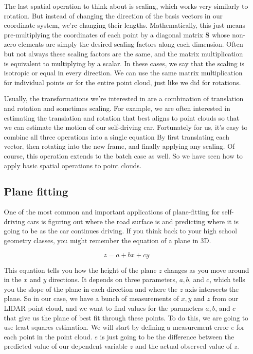 The last spatial operation
to think about is scaling, which works very similarly to rotation. But instead of changing the direction
of the basis vectors in our coordinate system,
we're changing their lengths. Mathematically, this just means
pre-multiplying the coordinates of each point by a diagonal matrix
$\mathbf{S}$ whose non-zero elements are simply the desired scaling
factors along each dimension. Often but not always these
scaling factors are the same, and the matrix multiplication is
equivalent to multiplying by a scalar. In these cases, we say that the scaling
is isotropic or equal in every direction. We can use the same matrix multiplication
for individual points or for the entire point cloud,
just like we did for rotations.

Usually, the transformations we're interested in are a combination of translation and rotation and
sometimes scaling. For example, we are often interested
in estimating the translation and rotation that best aligns
to point clouds so that we can estimate the motion
of our self-driving car. Fortunately for us, it's easy to combine
all three operations into a single equation By first translating each vector, then rotating into the new frame,
and finally applying any scaling. Of course, this operation
extends to the batch case as well. So we have seen how to apply basic
spatial operations to point clouds. 

\subsection{Plane fitting}
\label{plane_fitting}

One of the most common and important applications of plane-fitting for self-driving cars is figuring out
where the road surface is and predicting where it is going to
be as the car continues driving. If you think back to your
high school geometry classes, you might remember
the equation of a plane in 3D. 

\begin{equation}
z = a + bx +cy
\end{equation}

This equation tells you how the height of the plane $z$ changes as you move around in the $x$ and
$y$ directions. It depends on three parameters, $a, b$, and $c$, which tells you the slope of the plane in each direction and
where the $z$ axis intersects the plane. So in our case, we have a bunch
of measurements of $x, y$ and $z$ from our LIDAR point cloud, and we
want to find values for the parameters $a, b$, and $c$ that give us the plane
of best fit through these points. To do this, we are going to use least-squares estimation. We will start by defining a measurement
error $e$ for each point in the point cloud. $e$ is just going to be the difference
between the predicted value of our dependent variable $\hat{z}$  and
the actual observed value of $z$. 


